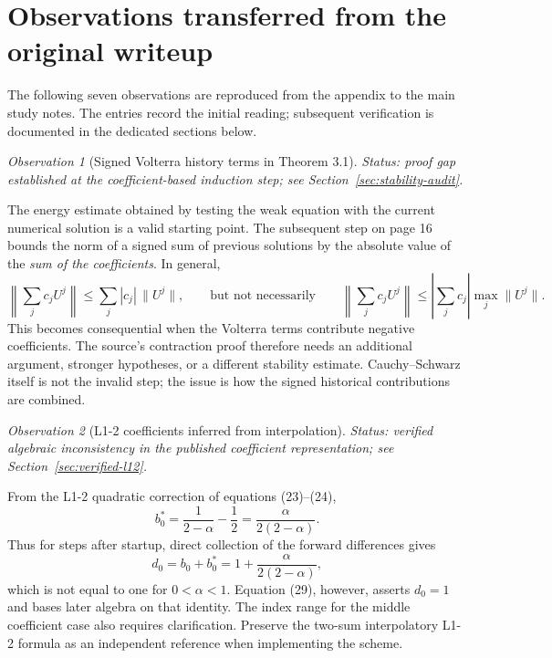 \documentclass[11pt,a4paper]{amsart}
\theoremstyle{remark}
\newtheorem{observation}{Observation}
\theoremstyle{plain}
\theoremstyle{remark}
\newcommand{\auditstatus}[1]{\par\noindent\emph{#1.}\enspace}
\numberwithin{equation}{section}
\begin{document}
\section{Observations transferred from the original writeup}
\label{sec:original-observations}

The following seven observations are reproduced from the appendix to the main study notes. The entries record the initial reading; subsequent verification is documented in the dedicated sections below.

\begin{observation}[Signed Volterra history terms in Theorem 3.1]
\auditstatus{Status: proof gap established at the coefficient-based induction step; see Section~\ref{sec:stability-audit}}

The energy estimate obtained by testing the weak equation with the current numerical solution is a valid starting point. The subsequent step on page 16 bounds the norm of a signed sum of previous solutions by the absolute value of the \emph{sum of the coefficients}. In general,
\[
\left\|\sum_j c_j U^j\right\|
\leq \sum_j |c_j|\,\|U^j\|,
\qquad\text{but not necessarily}\qquad
\left\|\sum_j c_j U^j\right\|
\leq\left|\sum_jc_j\right|\max_j\|U^j\|.
\]
This becomes consequential when the Volterra terms contribute negative coefficients. The source's contraction proof therefore needs an additional argument, stronger hypotheses, or a different stability estimate. Cauchy--Schwarz itself is not the invalid step; the issue is how the signed historical contributions are combined.
\end{observation}

\begin{observation}[L1-2 coefficients inferred from interpolation]
\auditstatus{Status: verified algebraic inconsistency in the published coefficient representation; see Section~\ref{sec:verified-l12}}

From the L1-2 quadratic correction of equations (23)--(24),
\[
 b_0^*=\frac{1}{2-\alpha}-\frac12=\frac{\alpha}{2(2-\alpha)}.
\]
Thus for steps after startup, direct collection of the forward differences gives
\[
 d_0=b_0+b_0^*=1+\frac{\alpha}{2(2-\alpha)},
\]
which is not equal to one for $0<\alpha<1$. Equation (29), however, asserts $d_0=1$ and bases later algebra on that identity. The index range for the middle coefficient case also requires clarification. Preserve the two-sum interpolatory L1-2 formula as an independent reference when implementing the scheme.
\end{observation}
\end{document}
